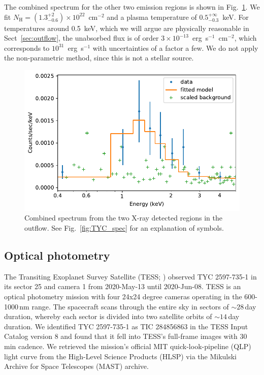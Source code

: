 \documentclass[linenumbers]{aastex631}
\begin{document}
The combined spectrum for the other two emission regions is shown in Fig.~\ref{fig:combined}. We fit $N_\mathrm{H}=(1.3_{-0.6}^{+2})\times10^{22}$~cm$^{-2}$ and a plasma temperature of $0.5_{-0.3}^{+\infty}$~keV. For temperatures around 0.5~keV, which we will argue are physically reasonable in Sect~\ref{sec:outflow}, the unabsorbed flux is of order $3 \times 10^{-13}$~erg~s$^{-1}$~cm$^{-2}$, which corresponds to $10^{31}$~erg~s$^{-1}$ with uncertainties of a factor a few. We do not apply the non-parametric method, since this is not a stellar source.
\begin{figure}
    \centering
    \includegraphics[width=\textwidth]{figures/combined.pdf}
    \caption{Combined spectrum from the two X-ray detected regions in the outflow. See Fig.~\ref{fig:TYC_spec} for an explanation of symbols.
    \label{fig:combined}}
\end{figure}


\subsection{Optical photometry}
The Transiting Exoplanet Survey Satellite (TESS; \citealt{Ricker2015}) observed TYC 2597-735-1 in its sector 25 and camera 1 from 2020-May-13 until 2020-Jun-08. 
TESS is an optical photometry mission with four 24x24 degree cameras operating in the 600-1000\,nm range. The spacecraft scans through the entire sky in sectors of $\sim28$\,day duration, whereby each sector is divided into two satellite orbits of $\sim14$\,day duration.
We identified TYC 2597-735-1 as TIC 284856863 in the TESS Input Catalog version 8 \citep{Stassun2019} and found that it fell into TESS's full-frame images with 30 min cadence.
We retrieved the mission's official MIT quick-look-pipeline (QLP) light curve from the High-Level Science Products (HLSP) via the Mikulski Archive for Space Telescopes (MAST) archive.
\end{document}

